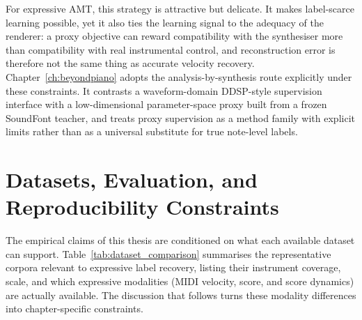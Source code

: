 For expressive AMT, this strategy is attractive but delicate. It makes label-scarce learning possible, yet it also ties the learning signal to the adequacy of the renderer: a proxy objective can reward compatibility with the synthesiser more than compatibility with real instrumental control, and reconstruction error is therefore not the same thing as accurate velocity recovery. Chapter~\ref{ch:beyondpiano} adopts the analysis-by-synthesis route explicitly under these constraints. It contrasts a waveform-domain DDSP-style supervision interface with a low-dimensional parameter-space proxy built from a frozen SoundFont teacher, and treats proxy supervision as a method family with explicit limits rather than as a universal substitute for true note-level labels.

\section{Datasets, Evaluation, and Reproducibility Constraints}
\label{sec:bg:dataeval}

The empirical claims of this thesis are conditioned on what each available dataset can support. Table~\ref{tab:dataset_comparison} summarises the representative corpora relevant to expressive label recovery, listing their instrument coverage, scale, and which expressive modalities (MIDI velocity, score, and score dynamics) are actually available. The discussion that follows turns these modality differences into chapter-specific constraints.

